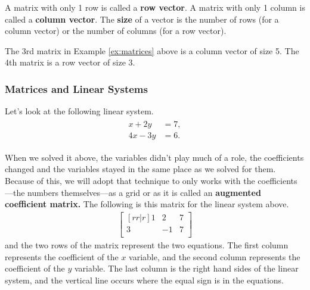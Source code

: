 \begin{definition}
A matrix with only 1 row is called a \textbf{row vector}.  A matrix with only 1 column is called a \textbf{column vector}.  The \textbf{size} of a vector is the number of rows (for a column vector) or the number of columns (for a row vector).
\end{definition}

The 3rd matrix in Example \ref{ex:matrices} above is a column vector of size 5.  The 4th matrix is a row vector of size 3.


\subsubsection{Matrices and Linear Systems}



Let's look at the following linear system.
%
\begin{align*}
\begin{split}
x + 2y & = 7, \\
4x -3 y & = 6.
\end{split}
\end{align*}

When we solved it above, the variables didn't play much of a role, the coefficients changed and the variables stayed in the same place as we solved for them.  Because of this, we will adopt that technique to only works with the coefficients---the numbers themselves---as a grid or as it is called an \textbf{augmented coefficient matrix.}    The following is this matrix for the linear system above.
%
\begin{align*}
\begin{bmatrix}[rr|r]
1 & 2 & 7 \\
3 & -1 & 7 \\
\end{bmatrix}
\end{align*}
and the two rows of the matrix represent the two equations.  The first column represents the coefficient of the $x$ variable, and the second column represents the coefficient of the $y$ variable.  The last column is the right hand sides of the linear system, and the vertical line occurs where the equal sign is in the equations.

